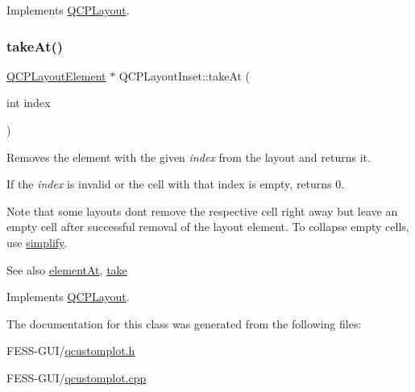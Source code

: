 Implements \hyperlink{class_q_c_p_layout_ada26cd17e56472b0b4d7fbbc96873e4c}{Q\+C\+P\+Layout}.

\hypertarget{class_q_c_p_layout_inset_ad6756a3b507e20496aaf7f5ca16c47d1}{}\label{class_q_c_p_layout_inset_ad6756a3b507e20496aaf7f5ca16c47d1} 
\subsubsection{\texorpdfstring{take\+At()}{takeAt()}}
{\footnotesize\ttfamily \hyperlink{class_q_c_p_layout_element}{Q\+C\+P\+Layout\+Element} $\ast$ Q\+C\+P\+Layout\+Inset\+::take\+At (\begin{DoxyParamCaption}\item[{int}]{index }\end{DoxyParamCaption})\hspace{0.3cm}{\ttfamily [virtual]}}

Removes the element with the given {\itshape index} from the layout and returns it.

If the {\itshape index} is invalid or the cell with that index is empty, returns 0.

Note that some layouts don\textquotesingle{}t remove the respective cell right away but leave an empty cell after successful removal of the layout element. To collapse empty cells, use \hyperlink{class_q_c_p_layout_inset_abb9eb23bf2d7c587a8abe02d065eae0a}{simplify}.

\begin{DoxySeeAlso}{See also}
\hyperlink{class_q_c_p_layout_inset_a832e049f0bb32e7db0490a9c904098df}{element\+At}, \hyperlink{class_q_c_p_layout_inset_a9ac707ccff650633b97f52dd5cddcf49}{take} 
\end{DoxySeeAlso}


Implements \hyperlink{class_q_c_p_layout_a5a79621fa0a6eabb8b520cfc04fb601a}{Q\+C\+P\+Layout}.



The documentation for this class was generated from the following files\+:\begin{DoxyCompactItemize}
\item 
F\+E\+S\+S-\/\+G\+U\+I/\hyperlink{qcustomplot_8h}{qcustomplot.\+h}\item 
F\+E\+S\+S-\/\+G\+U\+I/\hyperlink{qcustomplot_8cpp}{qcustomplot.\+cpp}\end{DoxyCompactItemize}
